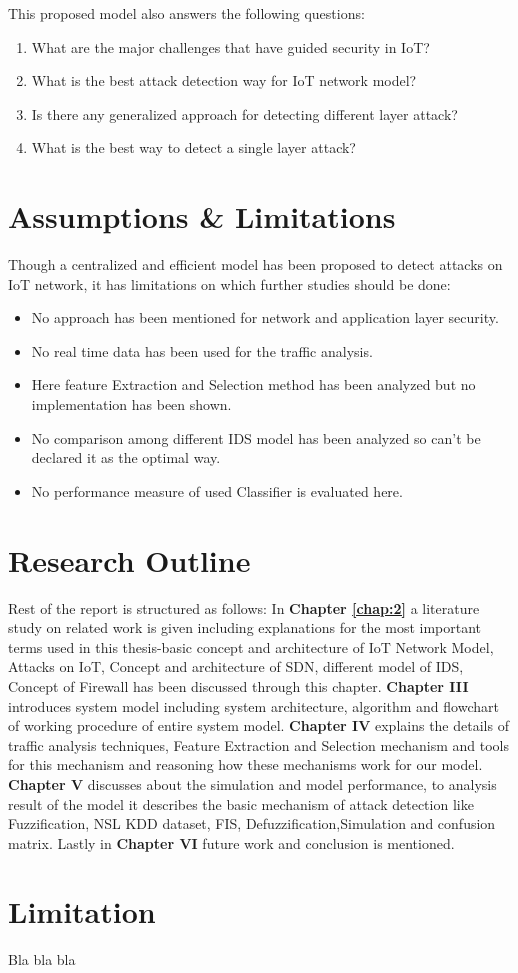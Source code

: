 This proposed model also answers the following questions:
\begin{enumerate}
    \item What are the major challenges that have guided security in IoT?
    \item What is the best attack detection way for IoT network model?
    \item Is there any generalized approach for detecting different layer attack?
    \item What is the best way to detect a single layer attack?
\end{enumerate}

\section{Assumptions \& Limitations}
Though a centralized and efficient model has been proposed to detect attacks on IoT network, it has limitations on which further studies should be done:
\begin{itemize}
    \item No approach has been mentioned for network and application layer security.
    \item No real time data has been used for the traffic analysis.
    \item Here feature Extraction and Selection method has been analyzed but no implementation has been shown.
    \item No comparison among different IDS model has been analyzed so can’t be declared it as the optimal way. 
    \item No performance measure of used Classifier is evaluated here.
\end{itemize}

\section{Research Outline}
Rest of the report is structured as follows: In \textbf{Chapter \ref{chap:2}} a literature study on related work is given including explanations for the most important terms used in this thesis-basic concept and architecture of IoT Network Model, Attacks on IoT, Concept and architecture of SDN, different model of IDS, Concept of Firewall has been discussed through this chapter. \textbf{Chapter III}  introduces system model including system architecture, algorithm and flowchart of working procedure of entire system model. \textbf{Chapter IV} explains the details of traffic analysis techniques, Feature Extraction and Selection mechanism and tools for this mechanism and reasoning how these mechanisms work for our model. \textbf{Chapter V} discusses about the simulation and model performance, to analysis result of the model it describes the basic mechanism of attack detection like Fuzzification, NSL KDD dataset, FIS, Defuzzification,Simulation and confusion matrix. Lastly in \textbf{Chapter VI} future work and conclusion is mentioned. 

\section{Limitation}
Bla bla bla
\label{sec:EffSearch} 

